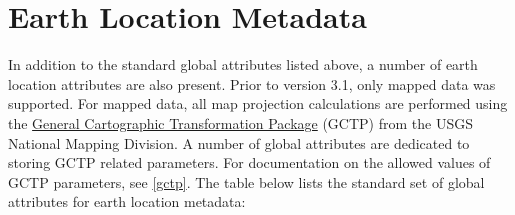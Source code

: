 \section{Earth Location Metadata}

In addition to the standard global attributes listed above, a number
of earth location attributes are also present. Prior to version 3.1,
only mapped data was supported. For mapped data, all map projection
calculations are performed using the
\href{http://edcwww.cr.usgs.gov/pub/software/gctpc}{General
Cartographic Transformation Package} (GCTP) from the USGS National
Mapping Division. A number of global attributes are dedicated to
storing GCTP related parameters. For documentation on the allowed
values of GCTP parameters, see \autoref{gctp}.  The table below lists
the standard set of global attributes for earth location metadata:

